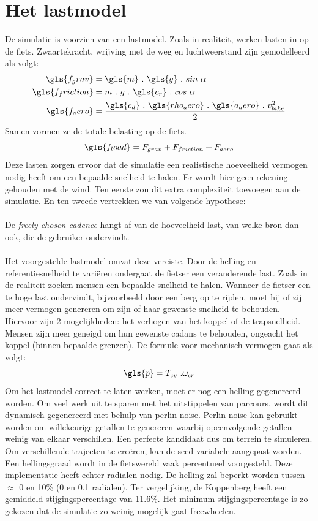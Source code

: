 \section{Het lastmodel}
De simulatie is voorzien van een lastmodel. Zoals in realiteit, werken lasten in op de fiets. Zwaartekracht, wrijving met de weg en luchtweerstand zijn gemodelleerd als volgt:
\\
\begin{align*}
\gls{f_grav}&=\gls{m} \ . \ \gls{g} \ . \ sin \ \alpha \\
\gls{f_friction}&=m \ . \ g \ . \ \gls{c_r} \ . \ cos \ \alpha \\
\gls{f_aero}&=\frac{\gls{c_d} \ . \ \gls{rho_aero} \ . \ \gls{a_aero} \ . \ v_{bike}^2}{2}
\end{align*}
Samen vormen ze de totale belasting op de fiets.
\[\gls{f_load} = F_{grav}+F_{friction}+F_{aero}\]
Deze lasten zorgen ervoor dat de simulatie een realistische hoeveelheid vermogen nodig heeft om een bepaalde snelheid te halen. Er wordt hier geen rekening gehouden met de wind. Ten eerste zou dit extra complexiteit toevoegen aan de simulatie. En ten tweede vertrekken we van volgende hypothese:
\\\\
\tab De \textit{freely chosen cadence} hangt af van de hoeveelheid last, van welke bron dan \tab ook, die de gebruiker ondervindt.
\\\\
Het voorgestelde lastmodel omvat deze vereiste. Door de helling en referentiesnelheid te variëren ondergaat de fietser een veranderende last. Zoals in de realiteit zoeken mensen een bepaalde snelheid te halen. Wanneer de fietser een te hoge last ondervindt, bijvoorbeeld door een berg op te rijden, moet hij of zij meer vermogen genereren om zijn of haar gewenste snelheid te behouden. Hiervoor zijn 2 mogelijkheden: het verhogen van het koppel of de trapsnelheid. Mensen zijn meer geneigd om hun gewenste cadans te behouden, ongeacht het koppel (binnen bepaalde grenzen). De formule voor mechanisch vermogen gaat als volgt:
\[\gls{p}=T_{cy} \ . \omega_{cr} \]
Om het lastmodel correct te laten werken, moet er nog een helling gegenereerd worden. Om veel werk uit te sparen met het uitstippelen van parcours, wordt dit dynamisch gegenereerd met behulp van perlin noise. Perlin noise kan gebruikt worden om willekeurige getallen te genereren waarbij opeenvolgende getallen weinig van elkaar verschillen. Een perfecte kandidaat dus om terrein te simuleren. Om verschillende trajecten te creëren, kan de seed variabele aangepast worden. Een hellingsgraad wordt in de fietswereld vaak percentueel voorgesteld. Deze implementatie heeft echter radialen nodig. De helling zal beperkt worden tussen $\approx$ 0 en 10\% (0 en 0.1 radialen). Ter vergelijking, de Koppenberg heeft een gemiddeld stijgingspercentage van 11.6\%. Het minimum stijgingspercentage is zo gekozen dat de simulatie zo weinig mogelijk gaat freewheelen.
